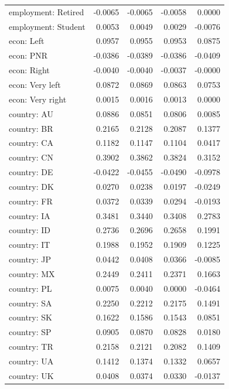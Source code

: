 \begin{tabular}{lrrrr}
employment: Retired & -0.0065 & -0.0065 & -0.0058 & 0.0000 \\
employment: Student & 0.0053 & 0.0049 & 0.0029 & -0.0076 \\
econ: Left & 0.0957 & 0.0955 & 0.0953 & 0.0875 \\
econ: PNR & -0.0386 & -0.0389 & -0.0386 & -0.0409 \\
econ: Right & -0.0040 & -0.0040 & -0.0037 & -0.0000 \\
econ: Very left & 0.0872 & 0.0869 & 0.0863 & 0.0753 \\
econ: Very right & 0.0015 & 0.0016 & 0.0013 & 0.0000 \\
country: AU & 0.0886 & 0.0851 & 0.0806 & 0.0085 \\
country: BR & 0.2165 & 0.2128 & 0.2087 & 0.1377 \\
country: CA & 0.1182 & 0.1147 & 0.1104 & 0.0417 \\
country: CN & 0.3902 & 0.3862 & 0.3824 & 0.3152 \\
country: DE & -0.0422 & -0.0455 & -0.0490 & -0.0978 \\
country: DK & 0.0270 & 0.0238 & 0.0197 & -0.0249 \\
country: FR & 0.0372 & 0.0339 & 0.0294 & -0.0193 \\
country: IA & 0.3481 & 0.3440 & 0.3408 & 0.2783 \\
country: ID & 0.2736 & 0.2696 & 0.2658 & 0.1991 \\
country: IT & 0.1988 & 0.1952 & 0.1909 & 0.1225 \\
country: JP & 0.0442 & 0.0408 & 0.0366 & -0.0085 \\
country: MX & 0.2449 & 0.2411 & 0.2371 & 0.1663 \\
country: PL & 0.0075 & 0.0040 & 0.0000 & -0.0464 \\
country: SA & 0.2250 & 0.2212 & 0.2175 & 0.1491 \\
country: SK & 0.1622 & 0.1586 & 0.1543 & 0.0851 \\
country: SP & 0.0905 & 0.0870 & 0.0828 & 0.0180 \\
country: TR & 0.2158 & 0.2121 & 0.2082 & 0.1409 \\
country: UA & 0.1412 & 0.1374 & 0.1332 & 0.0657 \\
country: UK & 0.0408 & 0.0374 & 0.0330 & -0.0137 \\
\bottomrule
\end{tabular}
